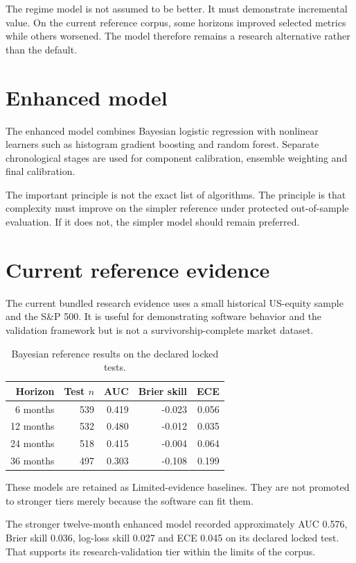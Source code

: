 \documentclass[11pt]{article}
\begin{document}
The regime model is not assumed to be better. It must demonstrate incremental value. On the current reference corpus, some horizons improved selected metrics while others worsened. The model therefore remains a research alternative rather than the default.

\section{Enhanced model}
The enhanced model combines Bayesian logistic regression with nonlinear learners such as histogram gradient boosting and random forest. Separate chronological stages are used for component calibration, ensemble weighting and final calibration.

The important principle is not the exact list of algorithms. The principle is that complexity must improve on the simpler reference under protected out-of-sample evaluation. If it does not, the simpler model should remain preferred.

\section{Current reference evidence}
The current bundled research evidence uses a small historical US-equity sample and the S\&P 500. It is useful for demonstrating software behavior and the validation framework but is not a survivorship-complete market dataset.

\begin{table}[ht]
\centering
\caption{Bayesian reference results on the declared locked tests.}
\begin{tabular}{rrrrr}
\toprule
Horizon & Test $n$ & AUC & Brier skill & ECE\\
\midrule
6 months & 539 & 0.419 & -0.023 & 0.056\\
12 months & 532 & 0.480 & -0.012 & 0.035\\
24 months & 518 & 0.415 & -0.004 & 0.064\\
36 months & 497 & 0.303 & -0.108 & 0.199\\
\bottomrule
\end{tabular}
\end{table}

These models are retained as Limited-evidence baselines. They are not promoted to stronger tiers merely because the software can fit them.

The stronger twelve-month enhanced model recorded approximately AUC 0.576, Brier skill 0.036, log-loss skill 0.027 and ECE 0.045 on its declared locked test. That supports its research-validation tier within the limits of the corpus.
\end{document}

